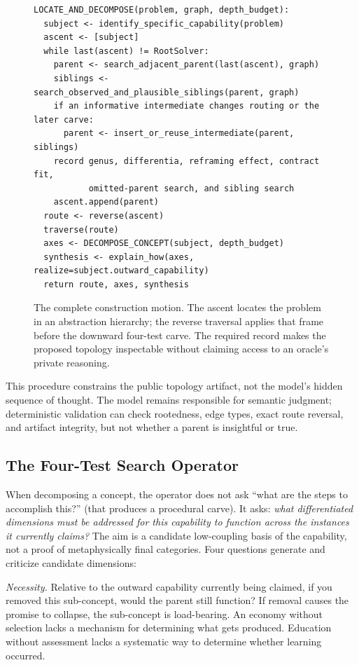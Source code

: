 \documentclass[11pt]{article}
\begin{document}
\begin{figure}[!htb]
\begin{rfbox}
\small
\begin{verbatim}
LOCATE_AND_DECOMPOSE(problem, graph, depth_budget):
  subject <- identify_specific_capability(problem)
  ascent <- [subject]
  while last(ascent) != RootSolver:
    parent <- search_adjacent_parent(last(ascent), graph)
    siblings <- search_observed_and_plausible_siblings(parent, graph)
    if an informative intermediate changes routing or the later carve:
      parent <- insert_or_reuse_intermediate(parent, siblings)
    record genus, differentia, reframing effect, contract fit,
           omitted-parent search, and sibling search
    ascent.append(parent)
  route <- reverse(ascent)
  traverse(route)
  axes <- DECOMPOSE_CONCEPT(subject, depth_budget)
  synthesis <- explain_how(axes, realize=subject.outward_capability)
  return route, axes, synthesis
\end{verbatim}
\end{rfbox}
\caption{The complete construction motion. The ascent locates the problem in an abstraction hierarchy; the reverse traversal applies that frame before the downward four-test carve. The required record makes the proposed topology inspectable without claiming access to an oracle's private reasoning.}
\label{fig:locate-and-decompose}
\end{figure}

This procedure constrains the public topology artifact, not the model's hidden sequence of thought. The model remains responsible for semantic judgment; deterministic validation can check rootedness, edge types, exact route reversal, and artifact integrity, but not whether a parent is insightful or true.

\subsection{The Four-Test Search Operator}
\label{sec:four-tests}

When decomposing a concept, the operator does not ask ``what are the steps to accomplish this?'' (that produces a procedural carve). It asks: \emph{what differentiated dimensions must be addressed for this capability to function across the instances it currently claims?} The aim is a candidate low-coupling basis of the capability, not a proof of metaphysically final categories. Four questions generate and criticize candidate dimensions:

\emph{Necessity.} Relative to the outward capability currently being claimed, if you removed this sub-concept, would the parent still function? If removal causes the promise to collapse, the sub-concept is load-bearing. An economy without selection lacks a mechanism for determining what gets produced. Education without assessment lacks a systematic way to determine whether learning occurred.
\end{document}
